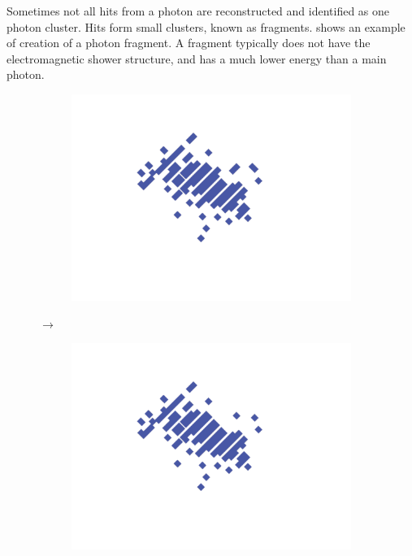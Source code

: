 Sometimes not all hits from a photon are reconstructed and identified as one photon cluster. Hits form small clusters, known as fragments.  shows an example of creation of a photon fragment. A fragment typically does not have the electromagnetic shower structure, and has a much lower energy than a main photon.




\begin{figure}[tbph]
\centering
  \begin{subfigure}[c]{0.3\textwidth}
    \includegraphics[width=\textwidth]{photon/allPhoton2}
    \caption{}
    \label{fig:photonEvtDspPhotonFragAll}
  \end{subfigure}
  {\LARGE$\xrightarrow{}$}%
  \begin{subfigure}[c]{0.3\textwidth}
    \includegraphics[width=\textwidth]{photon/big2}

\end{subfigure}
\end{figure}
